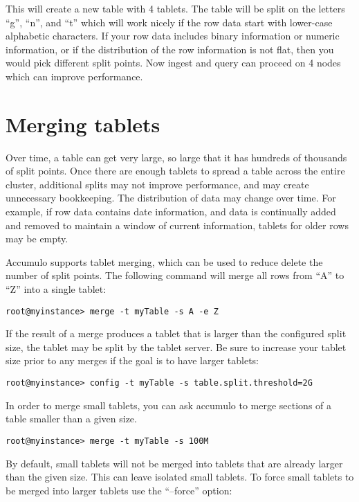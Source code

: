 This will create a new table with 4 tablets.  The table will be split
on the letters ``g'', ``n'', and ``t'' which will work nicely if the
row data start with lower-case alphabetic characters.  If your row
data includes binary information or numeric information, or if the
distribution of the row information is not flat, then you would pick
different split points.  Now ingest and query can proceed on 4 nodes
which can improve performance.

\section{Merging tablets}

Over time, a table can get very large, so large that it has hundreds
of thousands of split points.  Once there are enough tablets to spread
a table across the entire cluster, additional splits may not improve
performance, and may create unnecessary bookkeeping.  The distribution
of data may change over time.  For example, if row data contains date
information, and data is continually added and removed to maintain a
window of current information, tablets for older rows may be empty.

Accumulo supports tablet merging, which can be used to reduce delete
the number of split points.  The following command will merge all rows
from ``A'' to ``Z'' into a single tablet:

\small
\begin{verbatim}
root@myinstance> merge -t myTable -s A -e Z
\end{verbatim}
\normalsize

If the result of a merge produces a tablet that is larger than the
configured split size, the tablet may be split by the tablet server.
Be sure to increase your tablet size prior to any merges if the goal
is to have larger tablets:

\small
\begin{verbatim}
root@myinstance> config -t myTable -s table.split.threshold=2G
\end{verbatim}
\normalsize

In order to merge small tablets, you can ask accumulo to merge
sections of a table smaller than a given size.

\small
\begin{verbatim}
root@myinstance> merge -t myTable -s 100M
\end{verbatim}
\normalsize

By default, small tablets will not be merged into tablets that are
already larger than the given size.  This can leave isolated small
tablets.  To force small tablets to be merged into larger tablets use
the ``--force'' option:

